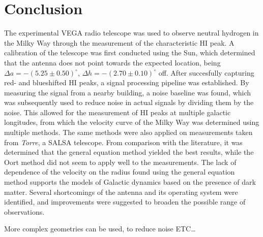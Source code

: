\section{Conclusion}

The experimental VEGA radio telescope was used to observe neutral hydrogen in the Milky Way through the measurement of the characteristic HI peak. A calibration of the telescope was first conducted using the Sun, which determined that the antenna does not point towards the expected location, being $\Delta a = -(5.25 \pm 0.50)^\circ$, $\Delta h = -(2.70 \pm 0.10)^\circ$ off. After succesfully capturing red- and blueshifted HI peaks, a signal processing pipeline was established. By measuring the signal from a nearby building, a noise baseline was found, which was subsequently used to reduce noise in actual signals by dividing them by the noise. This allowed for the measurement of HI peaks at multiple galactic longitudes, from which the velocity curve of the Milky Way was determined using multiple methods. The same methods were also applied on measurements taken from \emph{Torre}, a SALSA telescope. From comparison with the literature, it was determined that the general equation method yielded the best results, while the Oort method did not seem to apply well to the measurements. The lack of dependence of the velocity on the radius found using the general equation method supports the models of Galactic dynamics based on the presence of dark matter.   
Several shortcomings of the antenna and its operating system were identified, and improvements were suggested to broaden the possible range of observations.

More complex geometries can be used, to reduce noise ETC\ldots \cite{burke_introduction_2013}
